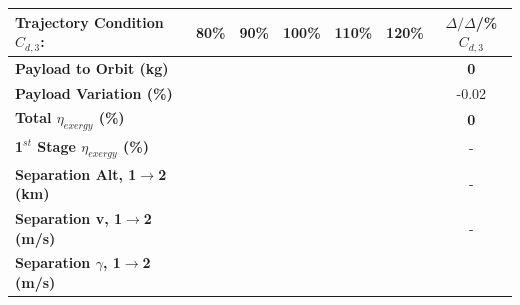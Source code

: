 \begin{table}[ht]
	\centering
	\begin{tabular}{l c c c c c c} 
		\hline \textbf{Trajectory Condition}   \qquad  $C_{d,3}$:
		&80\%
		&90\%
		&100\%
		&110\%
		&120\%
		& $\Delta/\Delta$/\%$C_{d,3}$
		\\
		\hline \textbf{Payload to Orbit (kg)}
		& \textbf{\PayloadToOrbitCdThreeEightyNoReturn}
		& \textbf{\PayloadToOrbitCdThreeNinetyNoReturn}
		& \textbf{\PayloadToOrbitCdThreeStandardNoReturn}
		& \textbf{\PayloadToOrbitCdThreeOneHundredTenNoReturn}
		& \textbf{\PayloadToOrbitCdThreeOneHundredTwentyNoReturn}
		&\textbf{0}
		\\
		\textbf{Payload Variation (\%)}
		& \PayloadVarCdThreeEightyNoReturn
		& \PayloadVarCdThreeNinetyNoReturn
		& \PayloadVarCdThreeStandardNoReturn
		& \PayloadVarCdThreeOneHundredTenNoReturn
		& \PayloadVarCdThreeOneHundredTwentyNoReturn
		&-0.02
		\\
		\textbf{Total $\eta_{exergy}$ (\%)}
		& \textbf{\totalExergyEffCdThreeEightyNoReturn}
		& \textbf{\totalExergyEffCdThreeNinetyNoReturn}
		& \textbf{\totalExergyEffCdThreeStandardNoReturn}
		& \textbf{\totalExergyEffCdThreeOneHundredTenNoReturn}
		& \textbf{\totalExergyEffCdThreeOneHundredTwentyNoReturn}
		& \textbf{0}
		\\
		\hline 
		\textbf{1$^{st}$ Stage $\eta_{exergy}$ (\%)}
		& \textbf{\firstExergyEffCdThreeEightyNoReturn}
		& \textbf{\firstExergyEffCdThreeNinetyNoReturn}
		& \textbf{\firstExergyEffCdThreeStandardNoReturn}
		& \textbf{\firstExergyEffCdThreeOneHundredTenNoReturn}
		& \textbf{\firstExergyEffCdThreeOneHundredTwentyNoReturn}
		& -
		\\
		\textbf{Separation Alt, 1$\rightarrow$2 (km)}
		& \firstsecondSeparationAltCdThreeEightyNoReturn
		& \firstsecondSeparationAltCdThreeNinetyNoReturn
		& \firstsecondSeparationAltCdThreeStandardNoReturn
		& \firstsecondSeparationAltCdThreeOneHundredTenNoReturn
		& \firstsecondSeparationAltCdThreeOneHundredTwentyNoReturn
		& -
		\\
		\textbf{Separation v, 1$\rightarrow$2 (m/s)}
		& \firstsecondSeparationvCdThreeEightyNoReturn
		& \firstsecondSeparationvCdThreeNinetyNoReturn
		& \firstsecondSeparationvCdThreeStandardNoReturn
		& \firstsecondSeparationvCdThreeOneHundredTenNoReturn
		& \firstsecondSeparationvCdThreeOneHundredTwentyNoReturn
		& -
		\\
		\textbf{Separation $\gamma$, 1$\rightarrow$2 (m/s)}
		& \firstsecondSeparationgammaCdThreeEightyNoReturn
		& \firstsecondSeparationgammaCdThreeNinetyNoReturn

\end{tabular}
\end{table}
